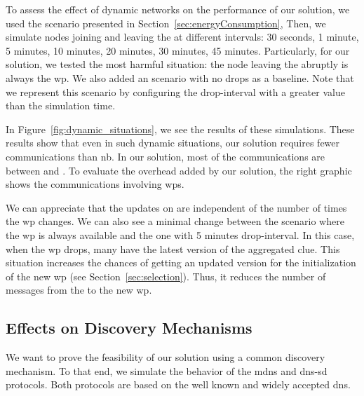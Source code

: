

To assess the effect of dynamic networks on the performance of our solution, we used the scenario presented in Section~\ref{sec:energyConsumption},
Then, we simulate nodes joining and leaving the \Space{} at different intervals: 30 seconds, 1 minute, 5 minutes, 10 minutes, 20 minutes, 30 minutes, 45 minutes.
Particularly, for our solution, we tested the most harmful situation: the node leaving the \Space{} abruptly is always the \ac{wp}.
We also added an scenario with no drops as a baseline.
Note that we represent this scenario by configuring the drop-interval with a greater value than the simulation time.

In Figure~\ref{fig:dynamic_situations}, we see the results of these simulations.
These results show that even in such dynamic situations, our solution requires fewer communications than \acl{nb}.
In our solution, most of the communications are between \consumers{} and \providers{}.
To evaluate the overhead added by our solution, the right graphic shows the communications involving \acp{wp}.

We can appreciate that the updates on \consumers{} are independent of the number of times the \ac{wp} changes.
We can also see a minimal change between the scenario where the \ac{wp} is always available and the one with 5 minutes drop-interval.
In this case, when the \ac{wp} drops, many \consumers{} have the latest version of the aggregated clue.
This situation increases the chances of getting an updated version for the initialization of the new \ac{wp} (see Section~\ref{sec:selection}).
Thus, it reduces the number of messages from the \providers{} to the new \ac{wp}.


\subsection{Effects on Discovery Mechanisms}
\label{sec:mdns}
We want to prove the feasibility of our solution using a common discovery mechanism.
To that end, we simulate the behavior of the \ac{mdns} and \ac{dns-sd}  protocols.
Both protocols are based on the well known and widely accepted \ac{dns}.

